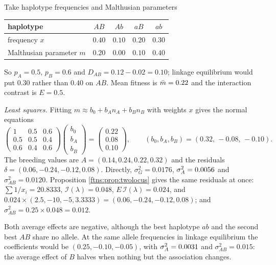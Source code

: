 \begin{example}
\label{ftns:ex:twolocus}
Take haplotype frequencies and Malthusian parameters
\begin{center}
\begin{tabular}{lcccc}
\toprule
haplotype & $AB$ & $Ab$ & $aB$ & $ab$ \\
\midrule
frequency $x$ & $0.40$ & $0.10$ & $0.20$ & $0.30$ \\
Malthusian parameter $m$ & $0.20$ & $0.00$ & $0.10$ & $0.40$ \\
\bottomrule
\end{tabular}
\end{center}
So $p_A=0.5$, $p_B=0.6$ and $D_{AB}=0.12-0.02=0.10$; linkage equilibrium would put $0.30$ rather
than $0.40$ on $AB$. Mean fitness is $\bar{m}=0.22$ and the interaction contrast is $E=0.5$.

\emph{Least squares.} Fitting $m\approx b_0+b_An_A+b_Bn_B$ with weights $x$ gives the normal
equations
\[
\begin{pmatrix}1&0.5&0.6\\0.5&0.5&0.4\\0.6&0.4&0.6\end{pmatrix}
\begin{pmatrix}b_0\\b_A\\b_B\end{pmatrix}
=\begin{pmatrix}0.22\\0.08\\0.10\end{pmatrix},
\qquad (b_0,b_A,b_B)=(0.32,\,-0.08,\,-0.10).
\]
The breeding values are $A=(0.14,0.24,0.22,0.32)$ and the residuals
$\delta=(0.06,-0.24,-0.12,0.08)$. Directly, $\sigma^2_G=0.0176$, $\sigma^{2}_{A}=0.0056$ and
$\sigma^2_{AB}=0.0120$. Proposition \ref{ftns:prop:twolocus} gives the same residuals at once:
$\sum1/x_i=20.8333$, $\mathcal{I}(\lambda)=0.048$, $E\,\mathcal{I}(\lambda)=0.024$, and
$0.024\times(2.5,-10,-5,3.3333)=(0.06,-0.24,-0.12,0.08)$; and
$\sigma^2_{AB}=0.25\times0.048=0.012$.

Both average effects are negative, although the best haplotype $ab$ and the second best $AB$ share
no allele. At the same allele frequencies in linkage equilibrium the coefficients would be
$(0.25,-0.10,-0.05)$, with $\sigma^{2}_{A}=0.0031$ and $\sigma^2_{AB}=0.015$: the average effect of $B$ halves
when nothing but the association changes.


\end{example}
